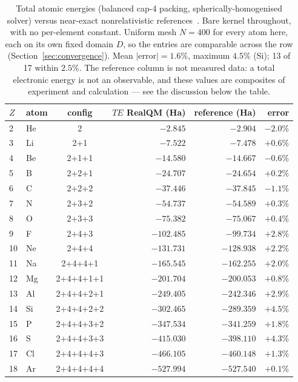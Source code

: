 \documentclass[11pt]{article}
\begin{document}
\begin{table}[t]
\centering
\caption{Total atomic energies (balanced cap-4 packing, spherically-homogenised solver)
versus near-exact nonrelativistic references~\cite{Chakravorty}. Bare kernel throughout, with no
per-element constant. Uniform mesh $N=400$ for every atom here, each on its own fixed domain
$D$, so the entries are comparable across the row (Section~\ref{sec:convergence}). Mean $|\mathrm{error}|=1.6\%$, maximum $4.5\%$ (Si); 13 of 17 within
$2.5\%$. The reference column is not measured data: a total electronic energy is not an
observable, and these values are composites of experiment and calculation --- see the discussion
below the table.}
\label{tab:TE}
\begin{tabular}{llcrrr}
\toprule
$Z$ & atom & config & $TE$ RealQM (Ha) & reference (Ha) & error \\
\midrule
2  & He & 2           & $-2.845$ & $-2.904$ & $-2.0\%$ \\
3  & Li & 2{+}1       & $-7.522$ & $-7.478$ & $+0.6\%$ \\
4  & Be & 2{+}1{+}1   & $-14.580$ & $-14.667$ & $-0.6\%$ \\
5  & B  & 2{+}2{+}1   & $-24.707$ & $-24.654$ & $+0.2\%$ \\
6  & C  & 2{+}2{+}2   & $-37.446$ & $-37.845$ & $-1.1\%$ \\
7  & N  & 2{+}3{+}2   & $-54.737$ & $-54.589$ & $+0.3\%$ \\
8  & O  & 2{+}3{+}3   & $-75.382$ & $-75.067$ & $+0.4\%$ \\
9  & F  & 2{+}4{+}3   & $-102.485$ & $-99.734$ & $+2.8\%$ \\
10 & Ne & 2{+}4{+}4   & $-131.731$ & $-128.938$ & $+2.2\%$ \\
11 & Na & 2{+}4{+}4{+}1 & $-165.545$ & $-162.255$ & $+2.0\%$ \\
12 & Mg & 2{+}4{+}4{+}1{+}1 & $-201.704$ & $-200.053$ & $+0.8\%$ \\
13 & Al & 2{+}4{+}4{+}2{+}1 & $-249.405$ & $-242.346$ & $+2.9\%$ \\
14 & Si & 2{+}4{+}4{+}2{+}2 & $-302.465$ & $-289.359$ & $+4.5\%$ \\
15 & P  & 2{+}4{+}4{+}3{+}2 & $-347.534$ & $-341.259$ & $+1.8\%$ \\
16 & S  & 2{+}4{+}4{+}3{+}3 & $-415.030$ & $-398.110$ & $+4.3\%$ \\
17 & Cl & 2{+}4{+}4{+}4{+}3 & $-466.105$ & $-460.148$ & $+1.3\%$ \\
18 & Ar & 2{+}4{+}4{+}4{+}4 & $-527.994$ & $-527.540$ & $+0.1\%$ \\
\bottomrule
\end{tabular}
\end{table}
\end{document}
